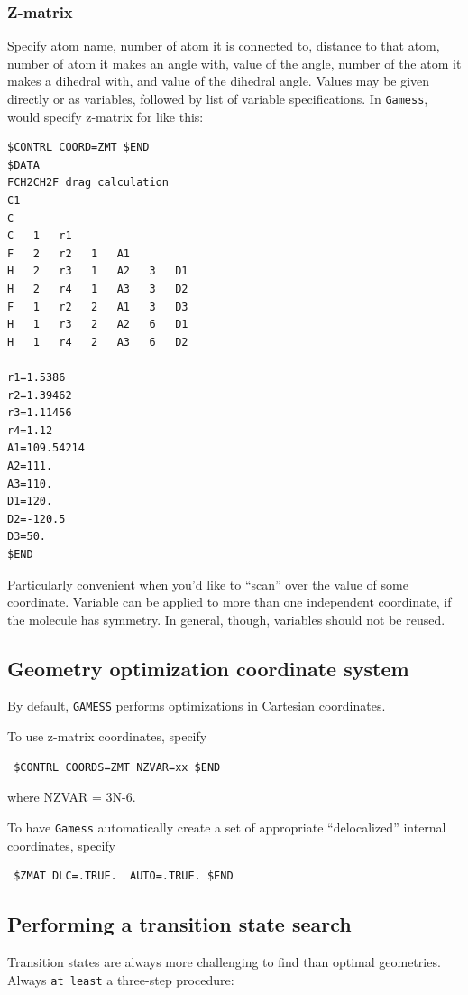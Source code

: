 \documentclass[11pt]{article}
\begin{document}
\subsubsection{Z-matrix}
\label{sec:org931e935}
Specify atom name, number of atom it is connected to, distance to that atom, number of atom it makes an angle with, value of the angle, number of the atom it makes a dihedral with, and value of the dihedral angle.  Values may be given directly or as variables, followed by list of variable specifications.  In \texttt{Gamess}, would specify z-matrix for  like this:
\begin{verbatim}
$CONTRL COORD=ZMT $END
$DATA
FCH2CH2F drag calculation
C1
C
C   1   r1
F   2   r2   1   A1
H   2   r3   1   A2   3   D1
H   2   r4   1   A3   3   D2
F   1   r2   2   A1   3   D3
H   1   r3   2   A2   6   D1
H   1   r4   2   A3   6   D2

r1=1.5386
r2=1.39462
r3=1.11456
r4=1.12
A1=109.54214
A2=111.
A3=110.
D1=120.
D2=-120.5
D3=50.
$END
\end{verbatim}
Particularly convenient when you'd like to ``scan'' over the value of some coordinate.  Variable can be applied to more than one independent coordinate, if the molecule has symmetry.  In general, though, variables should not be reused.

\subsection{Geometry optimization coordinate system}
\label{sec:org4674343}
By default, \texttt{GAMESS} performs optimizations in Cartesian coordinates.

To use z-matrix coordinates, specify
\begin{verbatim}
 $CONTRL COORDS=ZMT NZVAR=xx $END
\end{verbatim}
where NZVAR = 3N-6.

To have \texttt{Gamess} automatically create a set of appropriate ``delocalized'' internal coordinates, specify
\begin{verbatim}
 $ZMAT DLC=.TRUE.  AUTO=.TRUE. $END
\end{verbatim}
\subsection{Performing a transition state search}
\label{sec:org2d484a6}
Transition states are always more challenging to find than optimal geometries.  Always \texttt{at least} a three-step procedure:
\end{document}
